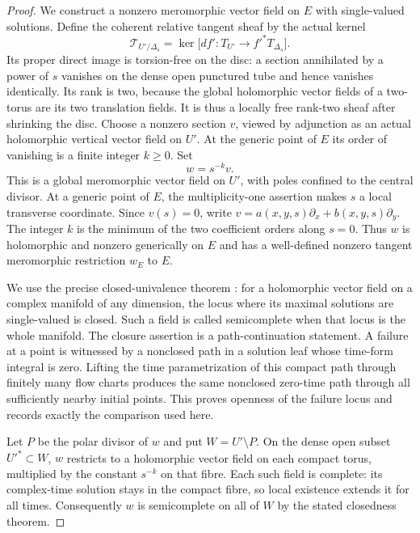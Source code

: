 \begin{proof}
We construct a nonzero meromorphic vector field
on $E$ with single-valued solutions. Define the
coherent relative tangent sheaf by the actual
kernel
\[
 \mathcal T_{U'/\Delta_s}
 =\ker\bigl[df':T_{U'}\longrightarrow f'^*T_{\Delta_s}\bigr].
 \tag{C.SC.4}\label{cdp:eq:C.SC.4}
\]
Its proper direct image is torsion-free on the
disc: a section annihilated by a power of $s$
vanishes on the dense open punctured tube and
hence vanishes identically. Its rank is two,
because the global holomorphic vector fields
of a two-torus are its two translation fields.
It is thus a locally free rank-two sheaf after
shrinking the disc. Choose a nonzero section
$v$, viewed by adjunction as an actual
holomorphic vertical vector field on $U'$.
At the generic point of $E$ its order of
vanishing is a finite integer $k\ge0$.
Set
\[
                              w=s^{-k}v.
 \tag{C.SC.5}\label{cdp:eq:C.SC.5}
\]
This is a global meromorphic vector field on
$U'$, with poles confined to the central
divisor. At a generic point of $E$, the
multiplicity-one assertion makes $s$ a local
transverse coordinate. Since $v(s)=0$, write
$v=a(x,y,s)\partial_x+b(x,y,s)\partial_y$.
The integer $k$ is the minimum of the two
coefficient orders along $s=0$. Thus $w$
is holomorphic and nonzero generically on
$E$ and has a well-defined nonzero tangent
meromorphic restriction $w_E$ to $E$.

We use the precise closed-univalence theorem
\cite[Theorem~3.3, with its proof]{Guillot2024}:
for a holomorphic vector field on a complex
manifold of any dimension, the locus where
its maximal solutions are single-valued is
closed. Such a field is called semicomplete
when that locus is the whole manifold.
The closure assertion is a path-continuation
statement. A failure at a point is witnessed
by a nonclosed path in a solution leaf whose
time-form integral is zero. Lifting the
time parametrization of this compact path
through finitely many flow charts produces
the same nonclosed zero-time path through
all sufficiently nearby initial points.
This proves openness of the failure locus
and records exactly the comparison used here.

Let $P$ be the polar divisor of $w$ and put
$W=U'\setminus P$. On the dense open subset
$U'^*\subset W$, $w$ restricts to a
holomorphic vector field on each compact
torus, multiplied by the constant $s^{-k}$
on that fibre. Each such field is complete:
its complex-time solution stays in the
compact fibre, so local existence extends
it for all times. Consequently $w$ is
semicomplete on all of $W$ by the stated
closedness theorem.


\end{proof}

